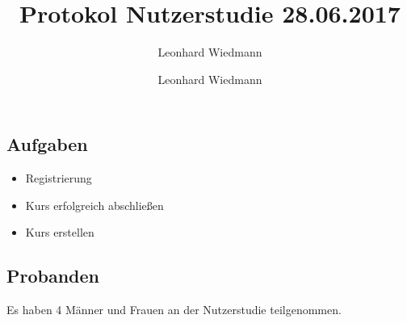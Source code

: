 \documentclass[colorback, accentcolor=tud1c, paper=a4]{tudexercise}
\title{Protokol Nutzerstudie 28.06.2017}
\subtitle{Leonhard Wiedmann}
\author{Leonhard Wiedmann}
\begin{document}
\maketitle
\subsection*{Aufgaben}
	\begin{itemize}
	\item Registrierung
  \item Kurs erfolgreich abschließen
  \item Kurs erstellen
	\end{itemize}

\subsection*{Probanden}
Es haben 4 Männer und Frauen an der Nutzerstudie teilgenommen.
\end{document}
